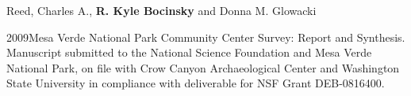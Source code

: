 Reed, Charles A., {\bf R. Kyle Bocinsky} and Donna M. Glowacki
\begin{list1}
\item[] 2009\hspace{.2cm}Mesa Verde National Park Community Center Survey: Report and Synthesis. Manuscript submitted to the National Science Foundation and Mesa Verde National Park, on file with Crow Canyon Archaeological Center and Washington State University in compliance with deliverable for NSF Grant DEB-0816400.
\end{list1}
